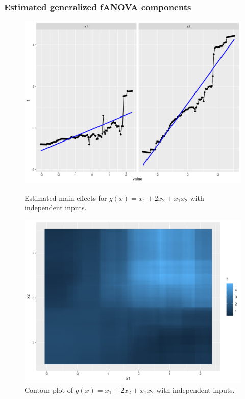 \subsubsection*{Estimated generalized fANOVA components}
\begin{figure}[htpb]
    \centering
    \begin{minipage}[t]{0.49\textwidth}
        \centering
        \includegraphics[width=\textwidth]{images/gg1_1.png}
        \caption{Estimated main effects for $g(x) = x_1 + 2 x_2 + x_1 x_2$ with independent inputs.}
        \label{fig:main_effects_estimated}
    \end{minipage}%
    \hfill
    \begin{minipage}[t]{0.49\textwidth}
        \centering
        \includegraphics[width=\textwidth]{images/gg1_2.png}
        \caption{Contour plot of $g(x) = x_1 + 2 x_2 + x_1 x_2$ with independent inputs.}
        \label{fig:contour_estimated}
    \end{minipage}
\end{figure}

